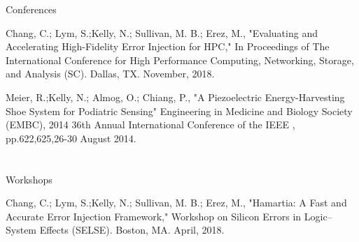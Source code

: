 \boldfont Conferences
\lightfont
\begin{squarelist}
	\item Chang, C.; Lym, S.;\regfont Kelly, N.\lightfont; Sullivan, M. B.; Erez, M., "Evaluating and Accelerating High-Fidelity Error Injection for HPC," In Proceedings of The International Conference for High Performance Computing, Networking, Storage, and Analysis (SC). Dallas, TX. November, 2018.
	\item Meier, R.;\regfont Kelly, N.\lightfont; Almog, O.; Chiang, P., "A Piezoelectric Energy-Harvesting Shoe System for Podiatric Sensing" Engineering in Medicine and Biology Society (EMBC), 2014 36th Annual International Conference of the IEEE , pp.622,625,26-30 August 2014.
\end{squarelist}

\paragraph{} ~\\

\boldfont Workshops
\lightfont
\begin{squarelist}
	\item Chang, C.; Lym, S.;\regfont Kelly, N.\lightfont; Sullivan, M. B.; Erez, M., "Hamartia: A Fast and Accurate Error Injection Framework," Workshop on Silicon Errors in Logic–System Effects (SELSE). Boston, MA. April, 2018.
\end{squarelist}
